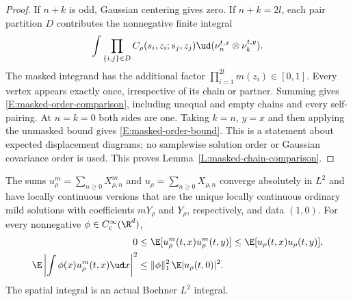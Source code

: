 \begin{proof}
  If $n+k$ is odd, Gaussian centering gives zero. If $n+k=2l$, each
  pair partition $D$ contributes the nonnegative finite integral
  \[
    \int \prod_{\{i,j\}\in D}
    C_\rho(s_i,z_i;s_j,z_j)
    \ud(\nu_n^{t,x}\otimes\nu_k^{t,y}).
  \]
  The masked integrand has the additional factor
  $\prod_{i=1}^{2l}m(z_i)\in[0,1]$. Every vertex appears exactly once,
  irrespective of its chain or partner. Summing gives
  \eqref{E:masked-order-comparison}, including unequal and empty chains
  and every self-pairing. At $n=k=0$ both sides are one.
  Taking $k=n$, $y=x$ and then applying the unmasked bound gives
  \eqref{E:masked-order-bound}. This is a statement about expected
  displacement diagrams; no samplewise solution order or Gaussian
  covariance order is used.
  This proves Lemma~\ref{L:masked-chain-comparison}.
\end{proof}

\begin{proposition}
  \label{P:masked-source-moments}
  The sums $u_\rho^m=\sum_{n\ge0}X_{\rho,n}^m$ and
  $u_\rho=\sum_{n\ge0}X_{\rho,n}$ converge absolutely in $L^2$ and
  have locally continuous versions that are the unique locally continuous
  ordinary mild solutions with coefficients $mY_\rho$ and $Y_\rho$,
  respectively, and data $(1,0)$. For every nonnegative
  $\phi\in C_c^\infty(\R^d)$,
  \begin{align}
    0&\le\E[u_\rho^m(t,x)u_\rho^m(t,y)]
    \le\E[u_\rho(t,x)u_\rho(t,y)],\label{E:masked-two-point}\\
    \E\left|\int\phi(x)u_\rho^m(t,x)\ud x\right|^2
    &\le \|\phi\|_1^2\,\E|u_\rho(t,0)|^2.
    \label{E:masked-average-source}
  \end{align}
  The spatial integral is an actual Bochner $L^2$ integral.
\end{proposition}

